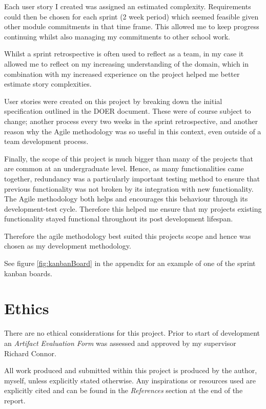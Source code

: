 \documentclass[a4paper,11pt]{article}
\begin{document}
Each user story I created was assigned an estimated complexity. Requirements could then be chosen for each sprint (2 week period) which seemed feasible given other module commitments in that time frame. This allowed me to keep progress continuing whilst also managing my commitments to other school work.

Whilst a sprint retrospective is often used to reflect as a team, in my case it allowed me to reflect on my increasing understanding of the domain, which in combination with my increased experience on the project helped me better estimate story complexities.

User stories were created on this project by breaking down the initial specification outlined in the DOER document. These were of course subject to change; another process every two weeks in the sprint retrospective, and another reason why the Agile methodology was so useful in this context, even outside of a team development process. 

Finally, the scope of this project is much bigger than many of the projects that are common at an undergraduate level. Hence, as many functionalities came together, redundancy was a particularly important testing method to ensure that previous functionality was not broken by its integration with new functionality. The Agile methodology both helps and encourages this behaviour through its development-test cycle. Therefore this helped me ensure that my projects existing functionality stayed functional throughout its post development lifespan.

Therefore the agile methodology best suited this projects scope and hence was chosen as my development methodology.

See figure \ref{fig:kanbanBoard} in the appendix for an example of one of the sprint kanban boards.

\section{Ethics}
There are no ethical considerations for this project. Prior to start of development an \textit{Artifact Evaluation Form} was assessed and approved by my supervisor Richard Connor.

All work produced and submitted within this project is produced by the author, myself, unless explicitly stated otherwise. Any inspirations or resources used are explicitly cited and can be found in the \textit{References} section at the end of the report.
\end{document}
